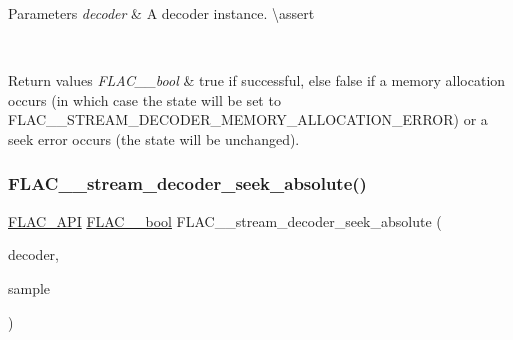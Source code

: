 \begin{DoxyParams}{Parameters}
{\em decoder} & A decoder instance. \textbackslash{}assert 
\begin{DoxyCode}{1}
\end{DoxyCode}
 \\
\hline
\end{DoxyParams}

\begin{DoxyRetVals}{Return values}
{\em F\+L\+A\+C\+\_\+\+\_\+bool} & {\ttfamily true} if successful, else {\ttfamily false} if a memory allocation occurs (in which case the state will be set to {\ttfamily F\+L\+A\+C\+\_\+\+\_\+\+S\+T\+R\+E\+A\+M\+\_\+\+D\+E\+C\+O\+D\+E\+R\+\_\+\+M\+E\+M\+O\+R\+Y\+\_\+\+A\+L\+L\+O\+C\+A\+T\+I\+O\+N\+\_\+\+E\+R\+R\+OR}) or a seek error occurs (the state will be unchanged). \\
\hline
\end{DoxyRetVals}
\mbox{\label{group__flac__stream__decoder_ga5c1c70de72e6ed49db6d61a9131d9117}} 
\subsubsection{\texorpdfstring{FLAC\_\_stream\_decoder\_seek\_absolute()}{FLAC\_\_stream\_decoder\_seek\_absolute()}}
{\footnotesize\ttfamily \mbox{\hyperlink{group__flac__export_ga56ca07df8a23310707732b1c0007d6f5}{F\+L\+A\+C\+\_\+\+A\+PI}} \mbox{\hyperlink{ordinals_8h_a95103469f1cbd78b8cf250194985b34e}{F\+L\+A\+C\+\_\+\+\_\+bool}} F\+L\+A\+C\+\_\+\+\_\+stream\+\_\+decoder\+\_\+seek\+\_\+absolute (\begin{DoxyParamCaption}\item[{\mbox{\hyperlink{struct_f_l_a_c_____stream_decoder}{F\+L\+A\+C\+\_\+\+\_\+\+Stream\+Decoder}} $\ast$}]{decoder,  }\item[{\mbox{\hyperlink{ordinals_8h_aa78c8c70a3eb8a58af7436f278acde8e}{F\+L\+A\+C\+\_\+\+\_\+uint64}}}]{sample }\end{DoxyParamCaption})}

